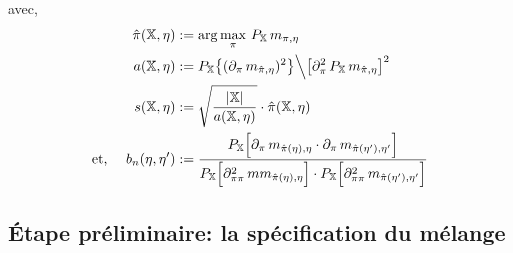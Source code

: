\documentclass{article}
\begin{document}
    avec,
    \begin{align*}
        \hat\pi(\mathbb{X},\eta)    & := \arg\max_\pi\,P_\mathbb{X}\,m_{\pi,\eta} \\
        a(\mathbb{X,\eta})          %
                                    & := P_\mathbb{X}\big\{ (\partial_\pi\,m_{\hat\pi,\eta})^2 \big\} \Big\backslash \big[ \partial^2_\pi\,P_\mathbb{X}\,m_{\hat\pi,\eta} \big]^2 \\
        s(\mathbb{X},\eta)          & := \sqrt{\dfrac{|\mathbb{X}|}{a(\mathbb{X},\eta)}}\cdot\hat\pi(\mathbb{X},\eta) \\
        \mbox{et, }\quad b_n(\eta,\eta') & := \dfrac{ P_\mathbb{X}\Big[ \partial_\pi\,m_{\hat\pi(\eta),\eta} \cdot \partial_\pi\,m_{\hat\pi(\eta'),\eta'}\Big]}{P_\mathbb{X}\Big[ \partial^2_{\pi\pi}\,mm_{\hat\pi(\eta),\eta}\Big] \cdot P_\mathbb{X}\Big[ \partial^2_{\pi\pi}\,m_{\hat\pi(\eta'),\eta'}\Big]}
    \end{align*}
    \vspace*{0.5cm}

    \newpage
    \subsection{Étape préliminaire: la spécification du mélange}
\end{document}
